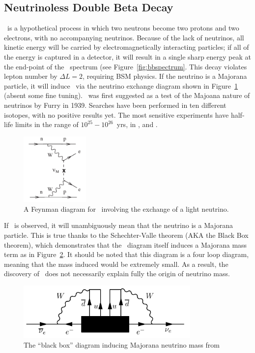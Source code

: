 \documentclass[/main.tex]{subfiles}
\begin{document}
\subsection{Neutrinoless Double Beta Decay}
\znbb\ is a hypothetical process in which two neutrons become two protons and two electrons, with no accompanying neutrinos.
Because of the lack of neutrinos, all kinetic energy will be carried by electromagnetically interacting particles; if all of the energy is captured in a detector, it will result in a single sharp energy peak at the end-point of the \tnbb\ spectrum (see Figure~\ref{fig:bbspectrum}.
This decay violates lepton number by $\Delta L=2$, requiring BSM physics.
If the neutrino is a Majorana particle, it will induce \znbb\ via the neutrino exchange diagram shown in Figure~\ref{fig:bbdiagram} (absent some fine tuning).
\znbb\ was first suggested as a test of the Majoana nature of neutrinos by Furry in 1939\cite{Furry1939}.
Searches have been performed in ten different isotopes, with no positive results yet.
The most sensitive experiments have half-life limits in the range of $10^{25}-10^{26}$~yrs, in \cite{kamlandzen}, \cite{gerda2018} and \cite{Cuore2018}.
\begin{figure}[t]
  \centering
  \includegraphics[width=0.3\textwidth]{znbbDiagramLNE}
  \caption[\znbb\ Decay Diagram]{\label{fig:bbdiagram}
    A Feynman diagram for \znbb\ involving the exchange of a light neutrino.
  }
\end{figure}

If \znbb\ is observed, it will unambiguously mean that the neutrino is a Majorana particle.
This is true thanks to the Schechter-Valle theorem (AKA the Black Box theorem), which demonstrates that the \znbb\ diagram itself induces a Majorana mass term as in Figure~\ref{fig:blackbox}\cite{Schechter1982}.
It should be noted that this diagram is a four loop diagram, meaning that the mass induced would be extremely small.
As a result, the discovery of \znbb\ does not necessarily explain fully the origin of neutrino mass.
\begin{figure}[t]
  \centering
  \includegraphics[width=0.8\textwidth]{blackboxdiagram}
  \caption[\znbb\ Decay Diagram]{\label{fig:blackbox}
    The ``black box'' diagram inducing Majorana neutrino mass from \znbb
  }
\end{figure}
\end{document}
